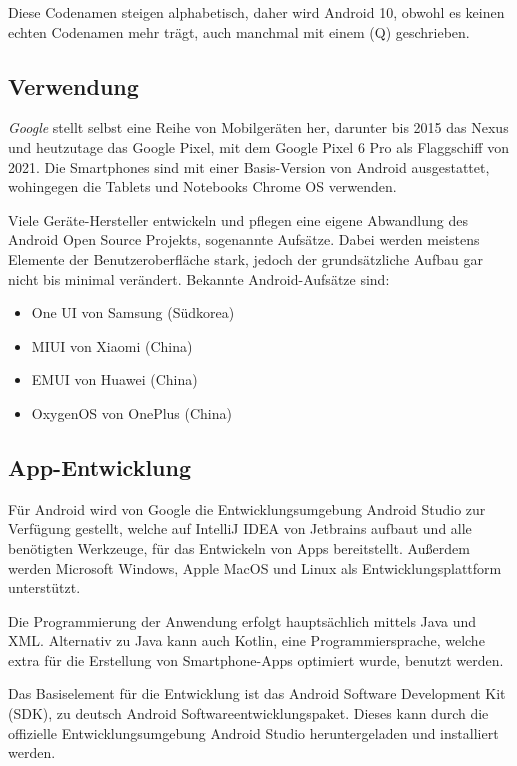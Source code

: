 Diese Codenamen steigen alphabetisch, daher wird Android 10, obwohl es keinen echten Codenamen mehr
trägt, auch manchmal mit einem (Q) geschrieben.

\subsection{Verwendung}
\textit{Google} stellt selbst eine Reihe von Mobilgeräten her, darunter bis 2015 das Nexus und
heutzutage das Google Pixel, mit dem Google Pixel 6 Pro als Flaggschiff von 2021. Die Smartphones
sind mit einer Basis-Version von Android ausgestattet, wohingegen die Tablets und Notebooks Chrome
OS verwenden.

Viele Geräte-Hersteller entwickeln und pflegen eine eigene Abwandlung des Android Open Source
Projekts, sogenannte Aufsätze. Dabei werden meistens Elemente der Benutzeroberfläche stark, jedoch
der grundsätzliche Aufbau gar nicht bis minimal verändert. Bekannte Android-Aufsätze sind:

\begin{itemize}
  \item One UI von Samsung (Südkorea)
  \item MIUI von Xiaomi (China)
  \item EMUI von Huawei (China)
  \item OxygenOS von OnePlus (China)
\end{itemize}

\subsection{App-Entwicklung}
Für Android wird von Google die Entwicklungsumgebung Android Studio zur Verfügung gestellt, welche
auf IntelliJ IDEA von Jetbrains aufbaut und alle benötigten Werkzeuge, für das Entwickeln
von Apps bereitstellt. Außerdem werden Microsoft Windows, Apple MacOS und Linux als
Entwicklungsplattform unterstützt.

Die Programmierung der Anwendung erfolgt hauptsächlich mittels Java und XML. Alternativ zu Java kann
auch Kotlin, eine Programmiersprache, welche extra für die Erstellung von Smartphone-Apps optimiert
wurde, benutzt werden.

Das Basiselement für die Entwicklung ist das Android Software Development Kit (SDK), zu deutsch
Android Softwareentwicklungspaket. Dieses kann durch die offizielle Entwicklungsumgebung Android
Studio heruntergeladen und installiert werden.
